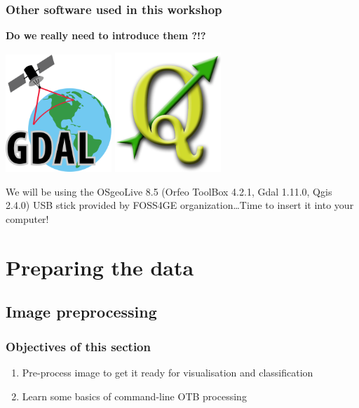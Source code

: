 \documentclass[8pt]{beamer}
\begin{document}
\begin{frame}
\frametitle{Other software used in this workshop}

\textbf{Do we really need to introduce them ?!?}

\begin{center}
\href{http://gdal.org/}{\includegraphics[width=0.3\textwidth]{images/gdal.png}} \quad \href{http://qgis.org/en/site/}{\includegraphics[width=0.3\textwidth]{images/qgis.png}}
\end{center}

We will be using the OSgeoLive 8.5 (Orfeo ToolBox 4.2.1, Gdal 1.11.0, Qgis 2.4.0) USB stick provided by FOSS4GE organization\ldots Time to insert it into your computer! 

\end{frame}


\section{Preparing the data}


\subsection{Image preprocessing}

\begin{frame}
\frametitle{Objectives of this section}

\begin{enumerate}
\item Pre-process image to get it ready for visualisation and classification
\item Learn some basics of command-line OTB processing
\end{enumerate}

\end{frame}
\end{document}
